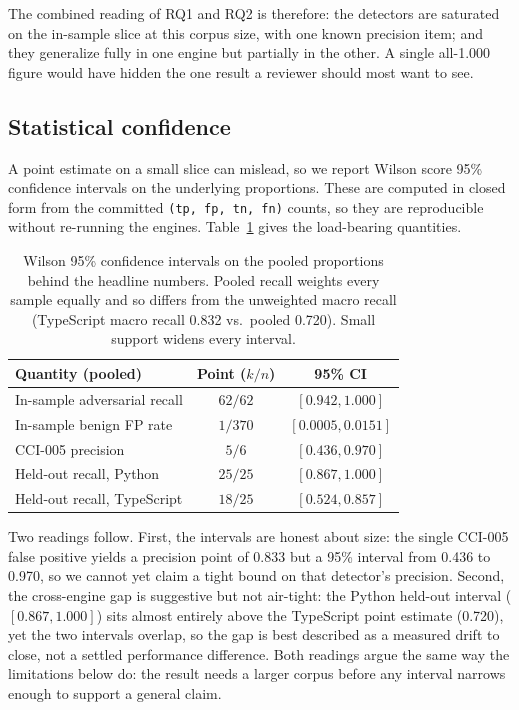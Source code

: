 The combined reading of RQ1 and RQ2 is therefore: the detectors
are saturated on the in-sample slice at this corpus size, with one
known precision item; and they generalize fully in one engine but
partially in the other. A single all-1.000 figure would have hidden the
one result a reviewer should most want to see.

\subsection{Statistical confidence}
\label{subsec:eval-ci}

A point estimate on a small slice can mislead, so we report Wilson score
95\% confidence intervals on the underlying proportions. These are
computed in closed form from the committed
\texttt{(tp, fp, tn, fn)} counts, so they are reproducible without
re-running the engines. Table~\ref{tab:ci} gives the load-bearing
quantities.

\begin{table}[t]
\centering
\caption{Wilson 95\% confidence intervals on the pooled proportions
behind the headline numbers. Pooled recall weights every sample equally
and so differs from the unweighted macro recall (TypeScript macro recall
0.832 vs.\ pooled 0.720). Small support widens every interval.}
\label{tab:ci}
\footnotesize
\begin{tabular}{@{}l c c@{}}
\toprule
Quantity (pooled) & Point ($k/n$) & 95\% CI \\
\midrule
In-sample adversarial recall & $62/62$ & $[0.942, 1.000]$ \\
In-sample benign FP rate     & $1/370$ & $[0.0005, 0.0151]$ \\
CCI-005 precision            & $5/6$   & $[0.436, 0.970]$ \\
Held-out recall, Python      & $25/25$ & $[0.867, 1.000]$ \\
Held-out recall, TypeScript  & $18/25$ & $[0.524, 0.857]$ \\
\bottomrule
\end{tabular}
\end{table}

Two readings follow. First, the intervals are honest about size: the
single CCI-005 false positive yields a precision point of 0.833 but a
95\% interval from 0.436 to 0.970, so we cannot yet claim a tight bound
on that detector's precision. Second, the cross-engine gap is suggestive
but not air-tight: the Python held-out interval ($[0.867, 1.000]$) sits
almost entirely above the TypeScript point estimate (0.720), yet the two
intervals overlap, so the gap is best described as a measured drift to
close, not a settled performance difference. Both readings argue the
same way the limitations below do: the result needs a larger corpus
before any interval narrows enough to support a general claim.

